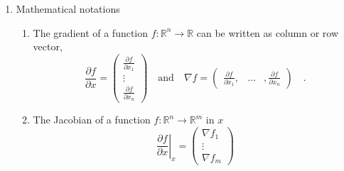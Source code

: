 \begin{enumerate}
\item Mathematical notations
	\begin{enumerate}
	\item The gradient of a function $f:\mathbb{R}^n\to\mathbb{R}$ can be written as column 
	or row vector,
		\begin{equation}
			\frac{\partial f}{\partial x} = \begin{pmatrix}
			\frac{\partial f}{\partial x_1} \\ \vdots \\ \frac{\partial f}{\partial x_n} 
			\end{pmatrix} \quad \text{and} \quad \nabla f = 
			 \begin{pmatrix}
			\frac{\partial f}{\partial x_1}, & \hdots &, \frac{\partial f}{\partial x_n}  
			\end{pmatrix}  \quad .
		\end{equation}
	\item The Jacobian of a function $f:\mathbb{R}^n \to \mathbb{R}^m$ in $x$
		\begin{equation}
		\left. \frac{\partial f}{\partial x} \right|_{x} = \begin{pmatrix}
		\nabla f_1 \\ \vdots \\ \nabla f_m
		\end{pmatrix}		 
		\end{equation}
	\end{enumerate}

\end{enumerate}

